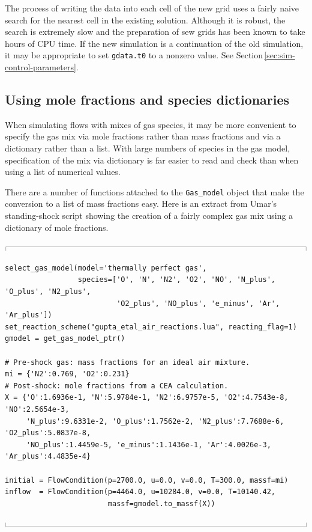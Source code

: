 \documentclass[12pt,a4paper,twoside]{article}
\newcommand{\topbar}{\ensuremath{
    \rule{0.1mm}{2.0mm} \rule[2.0mm]{159.5mm}{0.1mm} \rule{0.1mm}{2.0mm}
}}
\newcommand{\bottombar}{\ensuremath{
    \rule{0.1mm}{2.0mm} \rule{159.5mm}{0.1mm} \rule{0.1mm}{2.0mm}
}}
\begin{document}
The process of writing the data into each cell of the new grid uses a fairly naive search for the 
nearest cell in the existing solution.
Although it is robust, the search is extremely slow and the preparation of sew grids has been known
to take hours of CPU time.
If the new simulation is a continuation of the old simulation, it may be appropriate to set
\texttt{gdata.t0} to a nonzero value.  See Section\,\ref{sec:sim-control-parameters}.

\subsection{Using mole fractions and species dictionaries}
\label{sec:MoleFractions}
%
When simulating flows with mixes of gas species, it may be more convenient to specify the gas mix
via mole fractions rather than mass fractions and via a dictionary rather than a list.
With large numbers of species in the gas model, specification of the mix via dictionary is far easier to
read and check than when using a list of numerical values. 

\medskip
There are a number of functions attached to the \texttt{Gas\_model} object that make the
conversion to a list of mass fractions easy.
Here is an extract from Umar's standing-shock script showing the creation of a fairly complex gas mix
using a dictionary of mole fractions.

\medskip\noindent\topbar\\
{\small %
\begin{verbatim}
select_gas_model(model='thermally perfect gas', 
                 species=['O', 'N', 'N2', 'O2', 'NO', 'N_plus', 'O_plus', 'N2_plus',
                          'O2_plus', 'NO_plus', 'e_minus', 'Ar', 'Ar_plus'])
set_reaction_scheme("gupta_etal_air_reactions.lua", reacting_flag=1)
gmodel = get_gas_model_ptr()

# Pre-shock gas: mass fractions for an ideal air mixture.
mi = {'N2':0.769, 'O2':0.231}
# Post-shock: mole fractions from a CEA calculation.
X = {'O':1.6936e-1, 'N':5.9784e-1, 'N2':6.9757e-5, 'O2':4.7543e-8, 'NO':2.5654e-3, 
     'N_plus':9.6331e-2, 'O_plus':1.7562e-2, 'N2_plus':7.7688e-6, 'O2_plus':5.0837e-8, 
     'NO_plus':1.4459e-5, 'e_minus':1.1436e-1, 'Ar':4.0026e-3, 'Ar_plus':4.4835e-4}

initial = FlowCondition(p=2700.0, u=0.0, v=0.0, T=300.0, massf=mi)
inflow  = FlowCondition(p=4464.0, u=10284.0, v=0.0, T=10140.42,
                        massf=gmodel.to_massf(X))
\end{verbatim}
}
\noindent\bottombar
\end{document}
